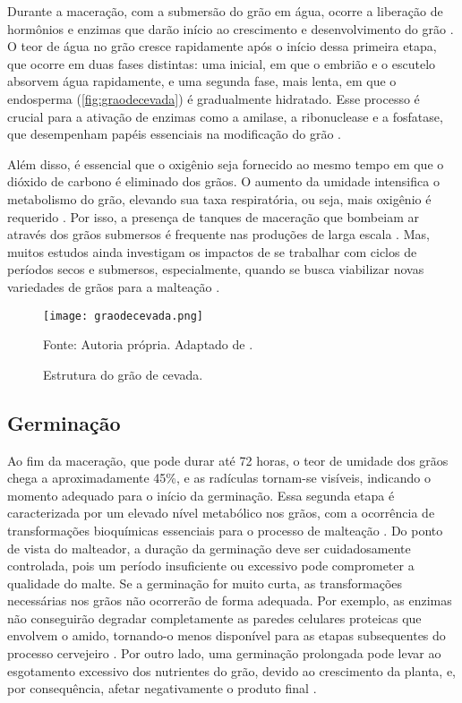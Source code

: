 Durante a maceração, com a submersão do grão em água, ocorre a liberação de hormônios e enzimas que darão início ao crescimento e desenvolvimento do grão \cite{LEWIS2012}. O teor de água no grão cresce rapidamente após o início dessa primeira etapa, que ocorre em duas fases distintas: uma inicial, em que o embrião e o escutelo absorvem água rapidamente, e uma segunda fase, mais lenta, em que o endosperma (\autoref{fig:graodecevada}) é gradualmente hidratado. Esse processo é crucial para a ativação de enzimas como a amilase, a ribonuclease e a fosfatase, que desempenham papéis essenciais na modificação do grão \cite{REYNOLDS1966}. 

Além disso, é essencial que o oxigênio seja fornecido ao mesmo tempo em que o dióxido de carbono é eliminado dos grãos. O aumento da umidade intensifica o metabolismo do grão, elevando sua taxa respiratória, ou seja, mais oxigênio é requerido \cite{KUNZE1996}. Por isso, a presença de tanques de maceração que bombeiam ar através dos grãos submersos é frequente nas produções de larga escala \cite{CENCI2021}. Mas, muitos estudos ainda investigam os impactos de se trabalhar com ciclos de períodos secos e submersos, especialmente, quando se busca viabilizar novas variedades de grãos para a malteação \cite{MAYER2014,TURNER2019}.

\begin{figure}[ht]
    \centering
    \caption{Estrutura do grão de cevada.}
    \label{fig:graodecevada}
    \texttt{[image: graodecevada.png]}

    {\centering\footnotesize Fonte: Autoria própria. Adaptado de .\par}
\end{figure}



\subsection{Germinação}

Ao fim da maceração, que pode durar até 72 horas, o teor de umidade dos grãos chega a aproximadamente 45\%, e as radículas tornam-se visíveis, indicando o momento adequado para o início da germinação. Essa segunda etapa é caracterizada por um elevado nível metabólico nos grãos, com a ocorrência de transformações bioquímicas essenciais para o processo de malteação \cite{MALLETT2022}. Do ponto de vista do malteador, a duração da germinação deve ser cuidadosamente controlada, pois um período insuficiente ou excessivo pode comprometer a qualidade do malte. Se a germinação for muito curta, as transformações necessárias nos grãos não ocorrerão de forma adequada. Por exemplo, as enzimas não conseguirão degradar completamente as paredes celulares proteicas que envolvem o amido, tornando-o menos disponível para as etapas subsequentes do processo cervejeiro \cite{FOX2009}. Por outro lado, uma germinação prolongada pode levar ao esgotamento excessivo dos nutrientes do grão, devido ao crescimento da planta, e, por consequência, afetar negativamente o produto final \cite{LEWIS2012}.

